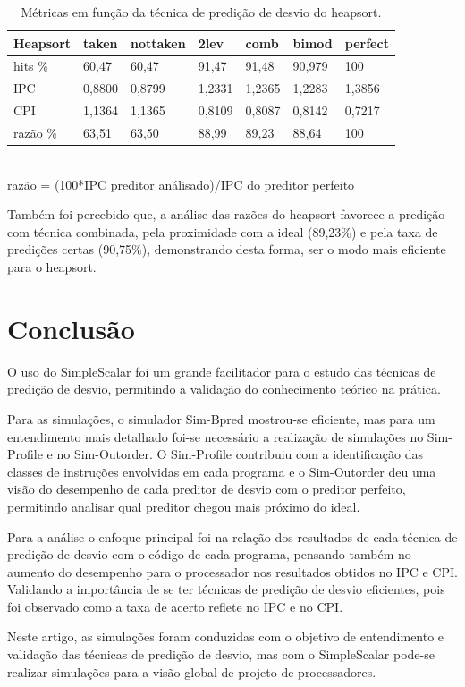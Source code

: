 \documentclass[12pt]{article}
\begin{document}
\begin{table}[ht]
\centering
\caption{Métricas em função da técnica de predição de desvio do heapsort.}
\label{tab:tblheap}
\smallskip
\begin{tabular}{l|l|l|l|l|l|l}
\hline
\textbf{Heapsort} & \textbf{taken} & \textbf{nottaken} & \textbf{2lev} & \textbf{comb} & \textbf{bimod} & \textbf{perfect} \\[0.5ex]
\hline
hits \% & 60,47 & 60,47 & 91,47 & 91,48 & 90,979 & 100 \\[0.5ex]
\hline
IPC & 0,8800 & 0,8799 & 1,2331 & 1,2365 & 1,2283 & 1,3856 \\[0.5ex]
\hline
CPI & 1,1364 & 1,1365 & 0,8109 & 0,8087 & 0,8142 & 0,7217 \\[0.5ex]
\hline
razão \% & 63,51 & 63,50 & 88,99 & 89,23 & 88,64 & 100 \\[0.5ex]
\hline
\end{tabular} \\
razão = (100*IPC preditor análisado)/IPC do preditor perfeito
\end{table}

Também foi percebido que, a análise das razões do heapsort favorece a predição com técnica combinada, pela proximidade com a ideal (89,23\%) e pela taxa de predições
certas (90,75\%), demonstrando desta forma, ser o modo mais eficiente para o heapsort.

\section{Conclusão}

O uso do SimpleScalar foi um grande facilitador para o estudo das técnicas de predição de desvio, permitindo a validação do conhecimento teórico na prática.

Para as simulações, o simulador Sim-Bpred mostrou-se eficiente, mas para um entendimento mais detalhado foi-se necessário a realização de simulações no Sim-Profile e no Sim-Outorder. O Sim-Profile contribuiu com a identificação das classes de instruções envolvidas em cada programa e o Sim-Outorder deu uma visão do desempenho de cada preditor de desvio com o preditor perfeito, permitindo analisar qual preditor chegou mais próximo do ideal.

Para a análise o enfoque principal foi na relação dos resultados de cada técnica de predição de desvio com o código de cada programa, pensando também no aumento do desempenho para o processador nos resultados obtidos no IPC e CPI. Validando a importância de se ter técnicas de predição de desvio eficientes, pois foi observado como a taxa de acerto reflete no IPC e no CPI. 

Neste artigo, as simulações foram conduzidas com o objetivo de entendimento e validação das técnicas de predição de desvio, mas com o SimpleScalar pode-se realizar simulações para a visão global de projeto de processadores. 

\nocite{austin2002simplescalar}
\nocite{simple}
\nocite{analise}



\end{document}
